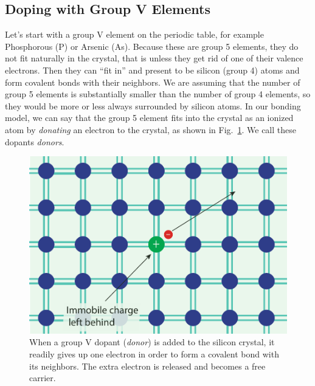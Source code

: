 \subsection{Doping with Group V Elements}
Let’s start with a group V element on the periodic table, for example Phosphorous (P) or Arsenic (As).  Because these are group 5 elements, they do not fit naturally in the crystal, that is unless they get rid of one of their valence electrons.  Then they can “fit in” and present to be silicon (group 4) atoms and form covalent bonds with their neighbors.  We are assuming that the number of group 5 elements is substantially smaller than the number of group 4 elements, so they would be more or less always surrounded by silicon atoms.  In our bonding model, we can say that the group 5 element fits into the crystal as an ionized atom by \emph{donating} an electron to the crystal, as shown in Fig.~\ref{fig:silicon_dopant_V}.   We call these dopants \emph{donors}.
\begin{figure}[tb]
\centering
\includegraphics[width=.5\columnwidth]{silicon_dopant_V}
\caption{When a group V dopant (\emph{donor}) is added to the silicon crystal, it readily gives up one electron in order to form a covalent bond with its neighbors.  The extra electron is released and becomes a free carrier.}
\label{fig:silicon_dopant_V}
\end{figure}
